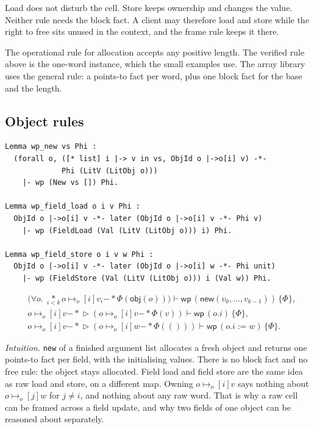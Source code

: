 \documentclass[11pt]{article}
\newcommand{\Unit}{\mathsf{()}}
\newcommand{\ptso}{\mathrel{\mapsto_{o}}}
\newcommand{\wand}{\mathbin{-\!\!*}}
\newcommand{\later}{\mathop{\triangleright}}
\newcommand{\Wpre}{\mathsf{wp}}
\begin{document}
Load does not disturb the cell.
Store keeps ownership and changes the value.
Neither rule needs the block fact.
A client may therefore load and store while the right to free sits unused in the context, and the frame rule keeps it there.

The operational rule for allocation accepts any positive length.
The verified rule above is the one-word instance, which the small examples use.
The array library uses the general rule: a points-to fact per word, plus one block fact for the base and the length.

\subsection{Object rules}

\begin{lstlisting}
Lemma wp_new vs Phi :
  (forall o, ([* list] i |-> v in vs, ObjId o |->o[i] v) -*-
             Phi (LitV (LitObj o)))
    |- wp (New vs []) Phi.

Lemma wp_field_load o i v Phi :
  ObjId o |->o[i] v -*- later (ObjId o |->o[i] v -*- Phi v)
    |- wp (FieldLoad (Val (LitV (LitObj o))) i) Phi.

Lemma wp_field_store o i v w Phi :
  ObjId o |->o[i] v -*- later (ObjId o |->o[i] w -*- Phi unit)
    |- wp (FieldStore (Val (LitV (LitObj o))) i (Val w)) Phi.
\end{lstlisting}

\begin{align*}
&\bigl(\forall o.\;
   \mathop{\ast}\limits_{i<k} o \ptso[i] v_i
   \wand \Phi(\mathsf{obj}(o))\bigr)
  \vdash
  \Wpre\,(\mathsf{new}(v_0,\ldots,v_{k-1}))\,\{\Phi\},\\
&o \ptso[i] v \wand \later(o \ptso[i] v \wand \Phi(v))
  \vdash
  \Wpre\,(o.i)\,\{\Phi\},\\
&o \ptso[i] v \wand \later(o \ptso[i] w \wand \Phi(\Unit))
  \vdash
  \Wpre\,(o.i := w)\,\{\Phi\}.
\end{align*}

\textit{Intuition.}
\texttt{new} of a finished argument list allocates a fresh object and returns one points-to fact per field, with the initialising values.
There is no block fact and no free rule: the object stays allocated.
Field load and field store are the same idea as raw load and store, on a different map.
Owning \(o \ptso[i] v\) says nothing about \(o \ptso[j] w\) for \(j\neq i\), and nothing about any raw word.
That is why a raw cell can be framed across a field update, and why two fields of one object can be reasoned about separately.
\end{document}
